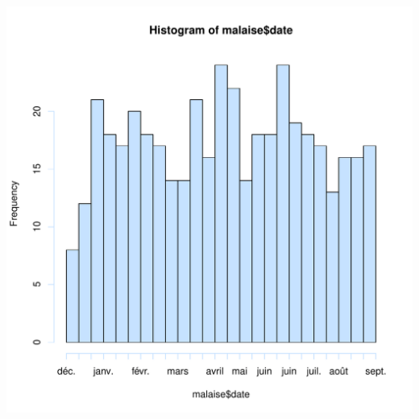 \documentclass[12pt,english,french,twoside]{report}\usepackage[]{graphicx}\usepackage[]{color}
\makeatletter
\def\maxwidth{ %
  \ifdim\Gin@nat@width>\linewidth
    \linewidth
  \else
    \Gin@nat@width
  \fi
}
\newenvironment{knitrout}{}{} %
\makeatother
\begin{document}
\begin{knitrout}
\color{fgcolor}
\includegraphics[width=\maxwidth]{figure/malaises} 

\end{knitrout}
\end{document}
